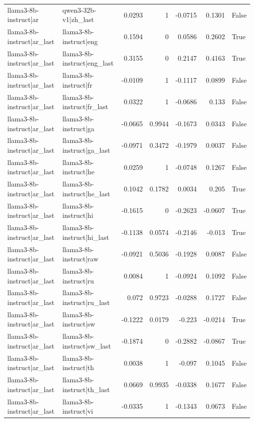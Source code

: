 \begin{table}
\begin{tabular}{l l r r r r l}
llama3-8b-instruct|ar & qwen3-32b-v1|zh_last & 0.0293 & 1 & -0.0715 & 0.1301 & False \\
llama3-8b-instruct|ar_last & llama3-8b-instruct|eng & 0.1594 & 0 & 0.0586 & 0.2602 & True \\
llama3-8b-instruct|ar_last & llama3-8b-instruct|eng_last & 0.3155 & 0 & 0.2147 & 0.4163 & True \\
llama3-8b-instruct|ar_last & llama3-8b-instruct|fr & -0.0109 & 1 & -0.1117 & 0.0899 & False \\
llama3-8b-instruct|ar_last & llama3-8b-instruct|fr_last & 0.0322 & 1 & -0.0686 & 0.133 & False \\
llama3-8b-instruct|ar_last & llama3-8b-instruct|ga & -0.0665 & 0.9944 & -0.1673 & 0.0343 & False \\
llama3-8b-instruct|ar_last & llama3-8b-instruct|ga_last & -0.0971 & 0.3472 & -0.1979 & 0.0037 & False \\
llama3-8b-instruct|ar_last & llama3-8b-instruct|he & 0.0259 & 1 & -0.0748 & 0.1267 & False \\
llama3-8b-instruct|ar_last & llama3-8b-instruct|he_last & 0.1042 & 0.1782 & 0.0034 & 0.205 & True \\
llama3-8b-instruct|ar_last & llama3-8b-instruct|hi & -0.1615 & 0 & -0.2623 & -0.0607 & True \\
llama3-8b-instruct|ar_last & llama3-8b-instruct|hi_last & -0.1138 & 0.0574 & -0.2146 & -0.013 & True \\
llama3-8b-instruct|ar_last & llama3-8b-instruct|raw & -0.0921 & 0.5036 & -0.1928 & 0.0087 & False \\
llama3-8b-instruct|ar_last & llama3-8b-instruct|ru & 0.0084 & 1 & -0.0924 & 0.1092 & False \\
llama3-8b-instruct|ar_last & llama3-8b-instruct|ru_last & 0.072 & 0.9723 & -0.0288 & 0.1727 & False \\
llama3-8b-instruct|ar_last & llama3-8b-instruct|sw & -0.1222 & 0.0179 & -0.223 & -0.0214 & True \\
llama3-8b-instruct|ar_last & llama3-8b-instruct|sw_last & -0.1874 & 0 & -0.2882 & -0.0867 & True \\
llama3-8b-instruct|ar_last & llama3-8b-instruct|th & 0.0038 & 1 & -0.097 & 0.1045 & False \\
llama3-8b-instruct|ar_last & llama3-8b-instruct|th_last & 0.0669 & 0.9935 & -0.0338 & 0.1677 & False \\
llama3-8b-instruct|ar_last & llama3-8b-instruct|vi & -0.0335 & 1 & -0.1343 & 0.0673 & False \\

\end{tabular}
\end{table}
